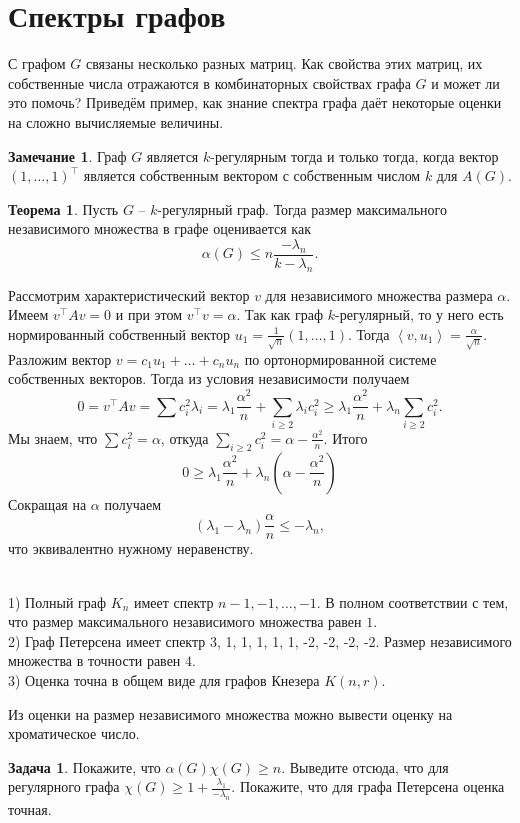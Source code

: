 \documentclass[10pt,a4paper,oneside]{book}
\theoremstyle{definition}
\newtheorem*{rem}{\color{green!50!blue}Замечание}
\newtheorem{zad}{\color{violet!100!black}Задача}
\newtheorem{thm}{\color{red!40!black}Теорема}
\renewcommand{\leq}{\leqslant}
\renewcommand{\geq}{\geqslant}
\def\exm{\noindent {\bf Примеры:}}
\def\lan{\left\langle }
\def\ran{\right\rangle}
\def\thrm{\begin{thm}}
\def\ethrm{\end{thm}}
\def\zd{\begin{zad}}
\def\ezd{\end{zad}}
\def\rm{\begin{rem}}
\def\erm{\end{rem}}
\begin{document}
\section{Спектры графов}
С графом $G$ связаны несколько разных матриц. Как свойства этих матриц, их собственные числа отражаются в комбинаторных свойствах графа $G$ и может ли это помочь?
Приведём пример, как знание спектра графа даёт некоторые оценки на сложно вычисляемые величины.

\rm Граф $G$ является $k$-регулярным тогда и только тогда, когда вектор $(1,\dots,1)^\top$ является собственным вектором с собственным числом $k$ для $A(G)$.
\erm

\thrm Пусть $G$ -- $k$-регулярный граф. Тогда размер максимального независимого множества в графе оценивается как
$$\alpha(G)\leq n\frac{-\lambda_n}{k-\lambda_n}.$$
\ethrm
\proof Рассмотрим характеристический вектор $v$ для независимого множества размера $\alpha$. Имеем $v^{\top}Av=0$ и при этом $v^{\top}v=\alpha$. Так как граф $k$-регулярный, то у него есть нормированный собственный вектор $u_1=\frac{1}{\sqrt{n}}(1,\dots,1)$. Тогда $\lan v,u_1\ran = \frac{\alpha}{\sqrt{n}}$. Разложим вектор $v=c_1u_1 + \dots + c_n u_n$ по ортонормированной системе собственных векторов. Тогда из условия независимости получаем
$$0=v^{\top}Av=\sum c_i^2 \lambda_i= \lambda_1\frac{\alpha^2}{n}+ \sum_{i\geq 2} \lambda_i c_i^2\geq \lambda_1\frac{\alpha^2}{n}+ \lambda_n \sum_{i\geq 2} c_i^2.$$
Мы знаем, что $\sum c_i^2=\alpha$, откуда $\sum_{i\geq 2} c_i^2=\alpha - \frac{\alpha^2}{n}$. Итого 
$$0\geq \lambda_1\frac{\alpha^2}{n}+\lambda_n(\alpha- \frac{\alpha^2}{n})$$
Сокращая на $\alpha$ получаем 
$$(\lambda_1-\lambda_n)\frac{\alpha}{n}\leq -\lambda_n,$$
что эквивалентно нужному неравенству.
\endproof




\exm\\
1) Полный граф $K_n$ имеет спектр $n-1,-1,\dots,-1$. В полном соответствии с тем, что размер максимального независимого множества равен $1$.\\
2) Граф Петерсена имеет спектр 3, 1, 1, 1, 1, 1, -2, -2, -2, -2. Размер независимого множества в точности равен $4$.\\
3) Оценка точна в общем виде для графов Кнезера $K(n,r)$.


Из оценки на размер независимого множества можно вывести оценку на хроматическое число.

\zd Покажите, что $\alpha(G) \chi(G) \geq n$. Выведите отсюда, что для регулярного графа $\chi(G)\geq 1+ \frac{\lambda_1}{-\lambda_n}$. Покажите, что для графа Петерсена оценка точная.
\ezd
\end{document}
